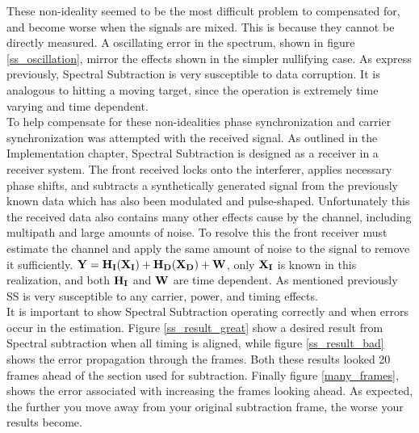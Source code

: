 These non-ideality seemed to be the most difficult problem to compensated for, and become worse when the signals are mixed.  This is because they cannot be directly measured.  A oscillating error in the spectrum, shown in figure \ref{ss_oscillation}, mirror the effects shown in the simpler nullifying case.  As express previously, Spectral Subtraction is very susceptible to data corruption.  It is analogous to hitting a moving target, since the operation is extremely time varying and time dependent.\\  

To help compensate for these non-idealities phase synchronization and carrier synchronization was attempted with the received signal.  As outlined in the Implementation chapter, Spectral Subtraction is designed as a receiver in a receiver system.  The front received locks onto the interferer, applies necessary phase shifts, and subtracts a synthetically generated signal from the previously known data which has also been modulated and pulse-shaped.  Unfortunately this the received data also contains many other effects cause by the channel, including multipath and large amounts of noise.  To resolve this the front receiver must estimate the channel and apply the same amount of noise to the signal to remove it sufficiently.  \( \bf{Y}=H_{I}(X_{I})+H_{D}(X_{D})+W \), only \(\bf{X_{I}}\) is known in this realization, and both \(\bf{H_{I}}\) and \(\bf{W}\) are time dependent.  As mentioned previously SS is very susceptible to any carrier, power, and timing effects.\\


It is important to show Spectral Subtraction operating correctly and when errors occur in the estimation.  Figure \ref{ss_result_great} show a desired result from Spectral subtraction when all timing is aligned, while figure \ref{ss_result_bad} shows the error propagation through the frames.  Both these results looked 20 frames ahead of the section used for subtraction.  Finally figure \ref{many_frames}, shows the error associated with increasing the frames looking ahead.  As expected, the further you move away from your original subtraction frame, the worse your results become.\\

